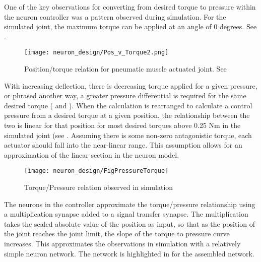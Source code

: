 
One of the key observations for converting from desired torque to pressure 
within the neuron controller was a pattern observed during simulation. For the
simulated joint, the maximum torque can be applied at an angle of 0 degrees. See .

\begin{figure}
\centering
\texttt{[image: neuron\_design/Pos\_v\_Torque2.png]}
\caption{Position/torque relation for pneumatic muscle actuated joint. See }
\label{fig:PositionTorque}
\end{figure}

With increasing deflection, there is decreasing torque applied for a given
pressure, or phrased another way, a greater pressure differential is required
for the same desired torque ( and ). When the calculation is rearranged to calculate
a control pressure from a desired torque at a given position, the relationship
between the two is linear for that position for most desired torques above
0.25 Nm in the simulated joint (see . Assuming there is some non-zero antagonistic
torque, each actuator should fall into the near-linear range. This assumption allows for
an approximation of the linear section in the neuron model.

\begin{figure}
\centering
\texttt{[image: neuron\_design/FigPressureTorque]}
\caption{Torque/Pressure relation observed in simulation}
\label{fig:PressureTorque}
\end{figure}


The neurons in the controller approximate the torque/pressure relationship using a multiplication synapse added
to a signal transfer synapse. The multiplication takes the scaled absolute 
value of the position as input, so that as the position of the joint reaches
the joint limit, the slope of the torque to pressure curve increases. This
approximates the observations in simulation with a relatively simple neuron
network. The network is highlighted in   for the assembled network.



